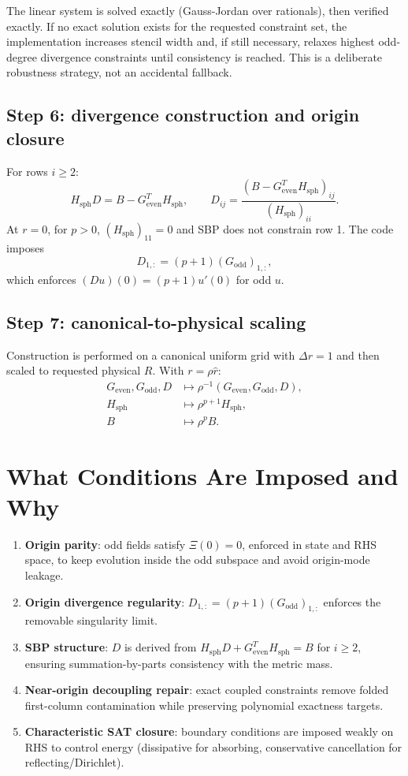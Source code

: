 \documentclass[
  aps,
  pre,
  reprint,
  superscriptaddress,
  nofootinbib
]{revtex4-2}
\newcommand{\Ge}{G_{\mathrm{even}}}
\newcommand{\Go}{G_{\mathrm{odd}}}
\newcommand{\Hs}{H_{\mathrm{sph}}}
\begin{document}
The linear system is solved exactly (Gauss-Jordan over rationals), then verified
exactly. If no exact solution exists for the requested constraint set, the
implementation increases stencil width and, if still necessary, relaxes highest
odd-degree divergence constraints until consistency is reached. This is a deliberate
robustness strategy, not an accidental fallback.

\subsection{Step 6: divergence construction and origin closure}
For rows $i\ge2$:
\begin{equation}
\Hs D = B-\Ge^T\Hs,\qquad
D_{ij}=\frac{(B-\Ge^T\Hs)_{ij}}{(\Hs)_{ii}}.
\end{equation}
At $r=0$, for $p>0$, $(\Hs)_{11}=0$ and SBP does not constrain row 1. The code imposes
\begin{equation}
D_{1,:}=(p+1)(\Go)_{1,:},
\end{equation}
which enforces $(Du)(0)=(p+1)u'(0)$ for odd $u$.

\subsection{Step 7: canonical-to-physical scaling}
Construction is performed on a canonical uniform grid with $\Delta r=1$ and then scaled
to requested physical $R$. With $r=\rho\hat r$:
\begin{align}
\Ge,\Go,D &\mapsto \rho^{-1}(\Ge,\Go,D),\\
\Hs &\mapsto \rho^{p+1}\Hs,\\
B &\mapsto \rho^p B.
\end{align}

\section{What Conditions Are Imposed and Why}
\begin{enumerate}
  \item \textbf{Origin parity}: odd fields satisfy $\Xi(0)=0$, enforced in state and
  RHS space, to keep evolution inside the odd subspace and avoid origin-mode leakage.
  \item \textbf{Origin divergence regularity}: $D_{1,:}=(p+1)(\Go)_{1,:}$ enforces the
  removable singularity limit.
  \item \textbf{SBP structure}: $D$ is derived from $\Hs D+\Ge^T\Hs=B$ for $i\ge2$,
  ensuring summation-by-parts consistency with the metric mass.
  \item \textbf{Near-origin decoupling repair}: exact coupled constraints remove folded
  first-column contamination while preserving polynomial exactness targets.
  \item \textbf{Characteristic SAT closure}: boundary conditions are imposed weakly on
  RHS to control energy (dissipative for absorbing, conservative cancellation for
  reflecting/Dirichlet).
\end{enumerate}
\end{document}
